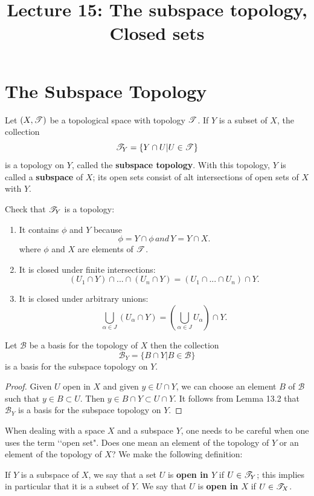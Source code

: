 \documentclass[a4paper,english,12pt]{article}
\title{Lecture 15: The subspace topology, Closed sets}
\author{}
\begin{document}
\maketitle

\section{The Subspace Topology}
\begin{defn}
	Let $(X,\mathscr{T})$ be a topological space with topology $\mathscr{T}$. If $Y$ is a subset of $X$, the collection 
	\[ \mathscr{T}_Y = \{Y \cap U | U \in \mathscr{T}\}	\]
	is a topology on $Y$, called the \textbf{subspace topology}. With this topology, $Y$ is called a \textbf{subspace} of $X$; its open sets consist of alt intersections of open sets of $X$ with $Y$.
\end{defn}
Check that $\mathscr{T}_Y$ is a topology: 
\begin{enumerate}
	\item It contains $\phi$ and $Y$ because 
	\[  \phi = Y \cap \phi \, and \, Y = Y \cap X.\]
	where $\phi$ and $X$ are elements of $\mathscr{T}$.	
	\item It is closed under finite intersections:
	\[ (U_1 \cap Y) \cap ... \cap (U_n \cap Y) = (U_1 \cap ... \cap U_n) \cap Y. \]	
	\item It is closed under arbitrary unions:
	\[ \bigcup_{\alpha \in J} (U_\alpha \cap Y) = (\bigcup_{\alpha \in J}U_\alpha) \cap Y.\]
\end{enumerate}

\begin{lem}
	Let $\mathcal{B}$ be a basis for the topology of $X$ then the collection
	\[ \mathcal{B}_Y = \{B \cap Y | B \in \mathcal{B\}} \]
	is a basis for the subspace topology on $Y$.
\end{lem}

\begin{proof}
	Given $U$ open in $X$ and given $y \in U \cap Y$, we can choose an element $B$ of $\mathcal{B}$ such that $y \in B \subset U$. Then $y \in B \cap Y \subset U \cap Y$. It follows from Lemma 13.2 that $\mathcal{B}_Y$ is a basis for the subspace topology on $Y$.
\end{proof}

When dealing with a space $X$ and a subspace $Y$, one needs to be careful when
one uses the term \lq \lq open set". Does one mean an element of the topology of $Y$ or an element of the topology of $X$? We make the following definition:

\begin{defn}
	If $Y$ is a subspace of $X$, we say that a set $U$ is \textbf{open in $Y$} if $U \in \mathscr{T}_Y$; this implies in particular that it is a subset of $Y$. We say that $U$ is \textbf{open in $X$} if $U \in \mathscr{T}_X$.
\end{defn} 
\end{document}
